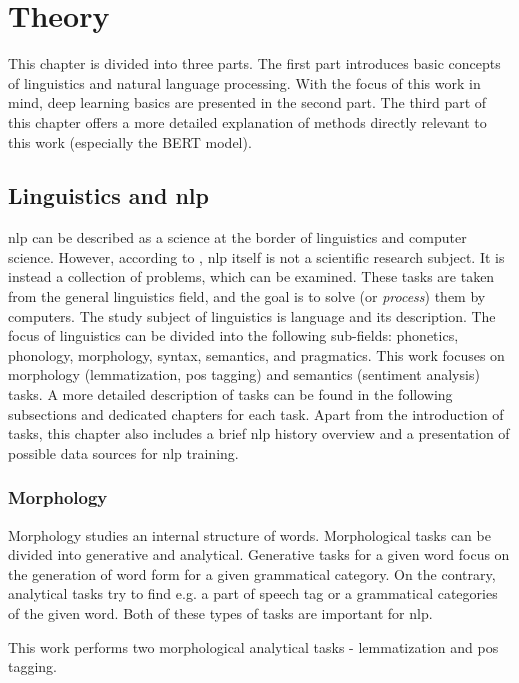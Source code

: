 \chapter{Theory}
\label{chap:theandme}
This chapter is divided into three parts. The first part introduces basic concepts of linguistics and natural language processing. With the focus of this work in mind, deep learning basics are presented in the second part. The third part of this chapter offers a more detailed explanation of methods directly relevant to this work (especially the BERT model).

\section{Linguistics and \acrlong{nlp}}
\acrfull{nlp} can be described as a science at the border of linguistics and computer science. However, according to \citep{Wilks}, \acrshort{nlp} itself is not a scientific research subject. It is instead a collection of problems, which can be examined. These tasks are taken from the general linguistics field, and the goal is to solve (or \textit{process}) them by computers. The study subject of linguistics is language and its description. The focus of linguistics can be divided into the following sub-fields: phonetics, phonology, morphology, syntax, semantics, and pragmatics. This work focuses on morphology (lemmatization, \acrfull{pos} tagging) and semantics (sentiment analysis) tasks. A more detailed description of tasks can be found in the following subsections and dedicated chapters for each task. Apart from the introduction of tasks, this chapter also includes a brief \acrshort{nlp} history overview and a presentation of possible data sources for \acrshort{nlp} training.

\subsection{Morphology}
Morphology studies an internal structure of words. Morphological tasks can be divided into generative and analytical. Generative tasks for a given word focus on the generation of word form for a given grammatical category. On the contrary, analytical tasks try to find  e.g. a part of speech tag or a grammatical categories of the given word. Both of these types of tasks are important for \acrshort{nlp}. 
\par
This work performs two morphological analytical tasks - lemmatization and \acrfull{pos} tagging.

